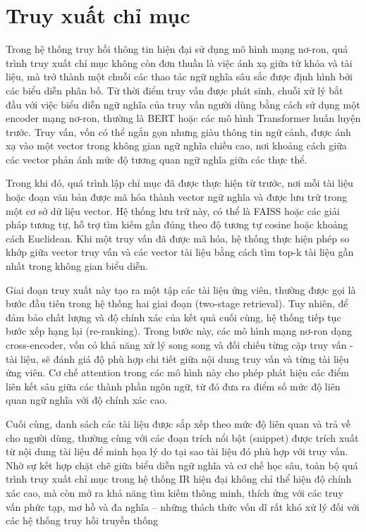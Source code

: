 \section{Truy xuất chỉ mục}
Trong hệ thống truy hồi thông tin hiện đại sử dụng mô hình mạng nơ-ron, quá trình truy xuất chỉ mục không còn đơn thuần là việc ánh xạ giữa từ khóa và tài liệu, mà trở thành một chuỗi các thao tác ngữ nghĩa sâu sắc được định hình bởi các biểu diễn phân bố. Từ thời điểm truy vấn được phát sinh, chuỗi xử lý bắt đầu với việc biểu diễn ngữ nghĩa của truy vấn người dùng bằng cách sử dụng một encoder mạng nơ-ron, thường là BERT hoặc các mô hình Transformer huấn luyện trước. Truy vấn, vốn có thể ngắn gọn nhưng giàu thông tin ngữ cảnh, được ánh xạ vào một vector trong không gian ngữ nghĩa chiều cao, nơi khoảng cách giữa các vector phản ánh mức độ tương quan ngữ nghĩa giữa các thực thể.

Trong khi đó, quá trình lập chỉ mục đã được thực hiện từ trước, nơi mỗi tài liệu hoặc đoạn văn bản được mã hóa thành vector ngữ nghĩa và được lưu trữ trong một cơ sở dữ liệu vector. Hệ thống lưu trữ này, có thể là FAISS hoặc các giải pháp tương tự, hỗ trợ tìm kiếm gần đúng theo độ tương tự cosine hoặc khoảng cách Euclidean. Khi một truy vấn đã được mã hóa, hệ thống thực hiện phép so khớp giữa vector truy vấn và các vector tài liệu bằng cách tìm top-k tài liệu gần nhất trong không gian biểu diễn.

Giai đoạn truy xuất này tạo ra một tập các tài liệu ứng viên, thường được gọi là bước đầu tiên trong hệ thống hai giai đoạn (two-stage retrieval). Tuy nhiên, để đảm bảo chất lượng và độ chính xác của kết quả cuối cùng, hệ thống tiếp tục bước xếp hạng lại (re-ranking). Trong bước này, các mô hình mạng nơ-ron dạng cross-encoder, vốn có khả năng xử lý song song và đối chiếu từng cặp truy vấn - tài liệu, sẽ đánh giá độ phù hợp chi tiết giữa nội dung truy vấn và từng tài liệu ứng viên. Cơ chế attention trong các mô hình này cho phép phát hiện các điểm liên kết sâu giữa các thành phần ngôn ngữ, từ đó đưa ra điểm số mức độ liên quan ngữ nghĩa với độ chính xác cao.

Cuối cùng, danh sách các tài liệu được sắp xếp theo mức độ liên quan và trả về cho người dùng, thường cùng với các đoạn trích nổi bật (snippet) được trích xuất từ nội dung tài liệu để minh họa lý do tại sao tài liệu đó phù hợp với truy vấn. Nhờ sự kết hợp chặt chẽ giữa biểu diễn ngữ nghĩa và cơ chế học sâu, toàn bộ quá trình truy xuất chỉ mục trong hệ thống IR hiện đại không chỉ thể hiện độ chính xác cao, mà còn mở ra khả năng tìm kiếm thông minh, thích ứng với các truy vấn phức tạp, mơ hồ và đa nghĩa -- những thách thức vốn dĩ rất khó xử lý đối với các hệ thống truy hồi truyền thống
